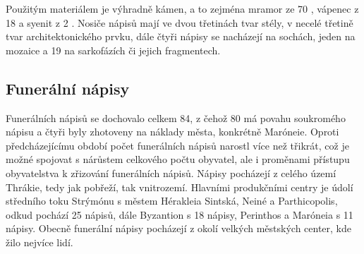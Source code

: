 Použitým materiálem je výhradně kámen, a to zejména mramor ze 70 , vápenec z 18  a syenit z 2 . Nosiče nápisů mají ve dvou třetinách tvar stély, v necelé třetině tvar architektonického prvku, dále čtyři nápisy se nacházejí na sochách, jeden na mozaice a 19 na sarkofázích či jejich fragmentech.

\subsection[funerální-nápisy-13]{Funerální nápisy}

Funerálních nápisů se dochovalo celkem 84, z čehož 80 má povahu soukromého nápisu a čtyři byly zhotoveny na náklady města, konkrétně Maróneie. Oproti předcházejícímu období počet funerálních nápisů narostl více než třikrát, což je možné spojovat s nárůstem celkového počtu obyvatel, ale i proměnami přístupu obyvatelstva k zřizování funerálních nápisů. Nápisy pocházejí z celého území Thrákie, tedy jak pobřeží, tak vnitrozemí. Hlavními produkčními centry je údolí středního toku Strýmónu s městem Hérakleia Sintská, Neiné a Parthicopolis, odkud pochází 25 nápisů, dále Byzantion s 18 nápisy, Perinthos a Maróneia s 11 nápisy. Obecně funerální nápisy pocházejí z okolí velkých městských center, kde žilo nejvíce lidí.

